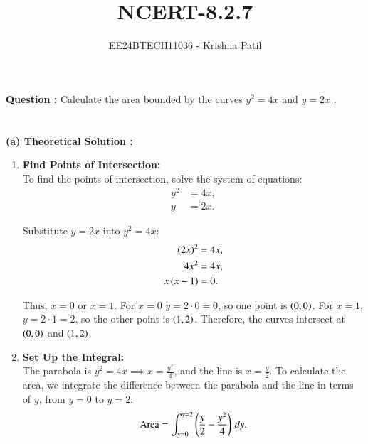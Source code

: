 \documentclass[journal]{IEEEtran}
\begin{document}

\vspace{3cm}

\title{NCERT-8.2.7}
\author{EE24BTECH11036 - Krishna Patil}
{\let\newpage\relax\maketitle}
\textbf{Question : } Calculate the area bounded by the curves $y^2 = 4x$ and $y = 2x$ . \\ \\
\solution \\
\textbf{(a) Theoretical Solution : }
\begin{enumerate}
    \item \textbf{Find Points of Intersection:} \\  
    To find the points of intersection, solve the system of equations:  
    \begin{align}
        y^2 &= 4x, \\
        y &= 2x.
    \end{align}

    Substitute $y = 2x$ into $y^2 = 4x$:  
    \begin{align}
        \left(2x\right)^2 &= 4x, \\
        4x^2 &= 4x, \\
        x \left(x - 1\right) &= 0.
    \end{align}

    Thus, $x = 0$ or $x = 1$.  
    For $x = 0$ $y = 2 \cdot 0 = 0$, so one point is $\left(0, 0\right)$.  
    For $x = 1$, $y = 2 \cdot 1 = 2$, so the other point is $\left(1, 2\right)$.  
    Therefore, the curves intersect at $\left(0, 0\right)$ and $\left(1, 2\right)$. \\

    \item \textbf{Set Up the Integral:}  \\
    The parabola is $y^2 = 4x \implies x = \frac{y^2}{4}$, and the line is $x = \frac{y}{2}$.  
    To calculate the area, we integrate the difference between the parabola and the line in terms of $y$, from $y = 0$ to $y = 2$:
    \begin{align}
        \text{Area} = \int_{y=0}^{y=2} \left( \frac{y}{2} - \frac{y^2}{4} \right) \, dy.
    \end{align} \\


\end{enumerate}
\end{document}
